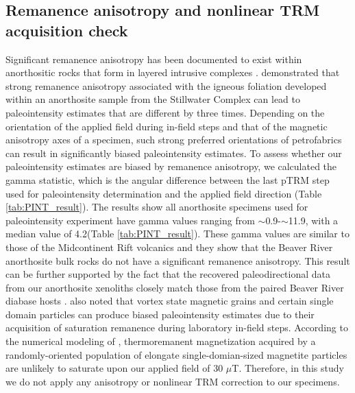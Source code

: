 \documentclass[draft]{agujournal2019}
\begin{document}
\subsection*{Remanence anisotropy and nonlinear TRM acquisition check}
Significant remanence anisotropy has been documented to exist within anorthositic rocks that form in layered intrusive complexes \cite{Selkin2000a, Feinberg2006a}. \cite{Selkin2000a} demonstrated that strong remanence anisotropy associated with the igneous foliation developed within an anorthosite sample from the Stillwater Complex can lead to paleointensity estimates that are different by three times. Depending on the orientation of the applied field during in-field steps and that of the magnetic anisotropy axes of a specimen, such strong preferred orientations of petrofabrics can result in significantly biased paleointensity estimates. To assess whether our paleointensity estimates are biased by remanence anisotropy, we calculated the gamma statistic, which is the angular difference between the last pTRM step used for paleointensity determination and the applied field direction (Table \ref{tab:PINT_result}). The results show all anorthosite specimens used for paleointensity experiment have gamma values ranging from $\sim$0.9\textdegree-$\sim$11.9\textdegree, with a median value of 4.2\textdegree (Table \ref{tab:PINT_result}). These gamma values are similar to those of the Midcontinent Rift volcanics \cite{Sprain2018a} and they show that the Beaver River anorthosite bulk rocks do not have a significant remanence anisotropy. This result can be further supported by the fact that the recovered paleodirectional data from our anorthosite xenoliths closely match those from the paired Beaver River diabase hosts \cite{Zhang2021b}. \cite{Selkin2007a} also noted that vortex state magnetic grains and certain single domain particles can produce biased paleointensity estimates due to their acquisition of saturation remanence during laboratory in-field steps. According to the numerical modeling of , thermoremanent magnetization acquired by a randomly-oriented population of elongate single-domian-sized magnetite particles are unlikely to saturate upon our applied field of 30 $\mu$T. Therefore, in this study we do not apply any anisotropy or nonlinear TRM correction to our specimens.

\end{document}

